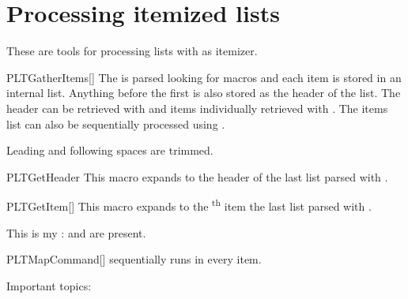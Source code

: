 \documentclass[a4paper, 11pt]{article}
\begin{document}
\section{Processing itemized lists}\label{sec:getitems}
These are tools for processing lists with  as itemizer.

\begin{macro}{PLTGatherItems}[]
    The  is parsed looking for  macros and each item is stored in an internal list. Anything before the first  is also stored as the header of the list. The header can be retrieved with  and items individually retrieved with . The items list can also be sequentially processed using .

    Leading and following spaces are trimmed.
\end{macro}

\begin{macro}{PLTGetHeader}
    This macro expands to the header of the last list parsed with .
\end{macro}

\begin{macro}{PLTGetItem}[]
    This macro expands to the \textsuperscript{th} item the last list parsed with .
\end{macro}

\begin{example}{}

    This is my \PLTGetHeader:  and  are present.
\end{example}

\begin{macro}{PLTMapCommand}[]
     sequentially runs  in every item.
\end{macro}

\begin{example}{}
    Important topics: \PLTMapCommand{\showwithbullet}
\end{example}
\end{document}
